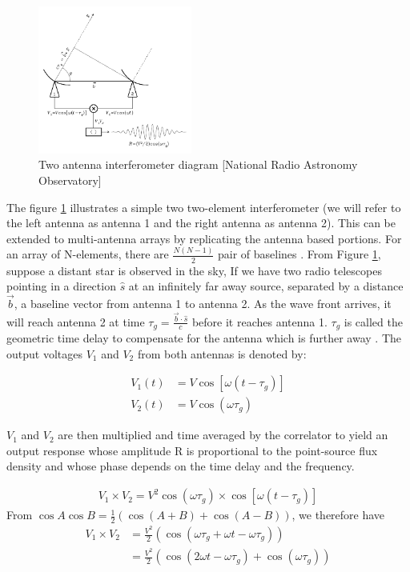 \begin{figure}[h!]
  \centering
    \includegraphics[width=0.45\textwidth]{images/Rint.png}
    \caption{Two antenna interferometer diagram [National Radio Astronomy Observatory]}
  \label{images/Rint.png}
\end{figure}

The figure \ref{images/Rint.png} illustrates a simple two two-element interferometer (we will refer to the left antenna as antenna 1 and the right antenna as antenna 2). This can be extended to multi-antenna arrays by replicating the antenna based portions. For an array of N-elements, there are $\frac{N(N-1)}{2}$ pair of baselines \citep{zensus1995very}. From Figure \ref{images/Rint.png}, suppose a distant star is observed in the sky, If we have two radio telescopes pointing in a direction $\widehat{s}$ at an infinitely far away source, separated by a distance $\overrightarrow{b}$, a  baseline vector from antenna 1 to antenna 2. As the wave front arrives, it will reach antenna 2 at time $\tau_{g}=\frac{\overrightarrow{b}\cdot\widehat{s}}{c}$ before it reaches antenna 1. $\tau_{g}$ is called the geometric time delay to compensate for the antenna which is further away \citep{taylor1999synthesis}. The output voltages $V_1$ and $V_2$ from both antennas is  denoted by: 

\begin{equation}\label{eq111}
\begin{split}
V_1(t)&=V\cos[\omega(t-\tau_{g})] \\
V_2(t)&=V\cos(\omega\tau_{g})
\end{split}
\end{equation}

$V_1$ and $V_2$ are then  multiplied and time averaged by the correlator to yield an output response whose amplitude R is proportional to the point-source flux density and whose phase depends on the time delay and the frequency.

\begin{align}
V_1 \times V_2 = V^2 \cos(\omega\tau_{g})\times \cos[\omega(t-\tau_{g})]
\end{align}
From $\cos A\cos B= \frac{1}{2} \left(\cos (A+B) + \cos (A-B) \right)$, 
we therefore have 
\begin{align*}
V_1 \times V_2&= \frac{V^2}{2} \left( \cos(\omega\tau_{g} + \omega t-\omega \tau_{g} )\right)\\
&= \frac{V^2}{2} \left(\cos(2\omega t - \omega \tau_{g}) + \cos (\omega\tau_{g})\right)
\end{align*}

